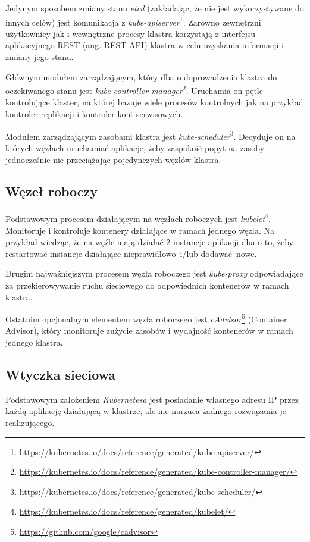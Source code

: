 \documentclass[a4paper,12pt,twoside,openany]{report}
\DeclareRobustCommand{\href}[2]{#2\footnote{\url{#1}}}
\begin{document}
Jedynym sposobem zmiany stanu \emph{etcd} (zakładając, że nie jest
wykorzystywane do innych celów) jest komunikacja z
\href{https://kubernetes.io/docs/reference/generated/kube-apiserver/}{\emph{kube-apiserver}}.
Zarówno zewnętrzni użytkownicy jak i wewnętrzne procesy klastra
korzystają z interfejsu aplikacyjnego REST (ang. REST API) klastra w
celu uzyskania informacji i zmiany jego stanu.

Głównym modułem zarządzającym, który dba o doprowadzenia klastra do
oczekiwanego stanu jest
\href{https://kubernetes.io/docs/reference/generated/kube-controller-manager/}{\emph{kube-controller-manager}}.
Uruchamia on pętle kontrolujące klaster, na której bazuje wiele procesów
kontrolnych jak na przykład kontroler replikacji i kontroler kont
serwisowych.

Modułem zarządzającym zasobami klastra jest
\href{https://kubernetes.io/docs/reference/generated/kube-scheduler/}{\emph{kube-scheduler}}.
Decyduje on na których węzłach uruchamiać aplikacje, żeby zaspokoić
popyt na zasoby jednocześnie nie przeciążając pojedynczych węzłów
klastra.

\hypertarget{wux119zeux142-roboczy}{%
\subsection{Węzeł roboczy}\label{wux119zeux142-roboczy}}

Podstawowym procesem działającym na węzłach roboczych jest
\href{https://kubernetes.io/docs/reference/generated/kubelet/}{\emph{kubelet}}.
Monitoruje i kontroluje kontenery działające w ramach jednego węzła. Na
przykład wiedząc, że na węźle mają działać 2 instancje aplikacji dba o
to, żeby restartować instancje działające nieprawidłowo~i/lub
dodawać~nowe.

Drugim najważniejszym procesem węzła roboczego jest \emph{kube-proxy}
odpowiadające za przekierowywanie ruchu sieciowego do odpowiednich
kontenerów w ramach klastra.

Ostatnim opcjonalnym elementem węzła roboczego jest
\href{https://github.com/google/cadvisor}{\emph{cAdvisor}} (Container
Advisor), który monitoruje zużycie zasobów i wydajność kontenerów w
ramach jednego klastra.

\hypertarget{wtyczka-sieciowa}{%
\subsection{Wtyczka sieciowa}\label{wtyczka-sieciowa}}

Podstawowym założeniem \emph{Kubernetesa} jest posiadanie własnego
adresu IP przez każdą aplikację działającą w klastrze, ale nie narzuca
żadnego rozwiązania je realizującego.
\end{document}
